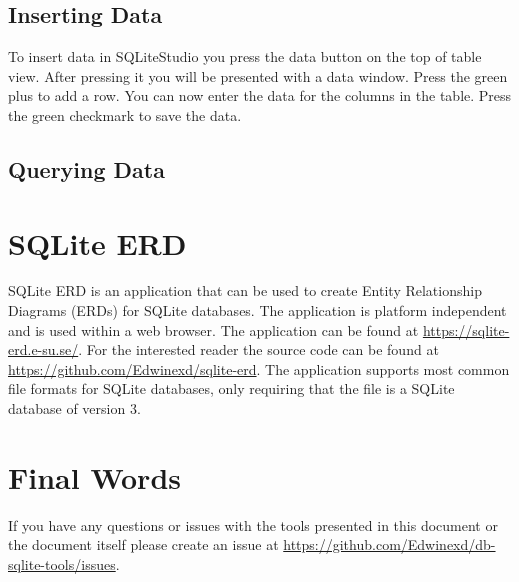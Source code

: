 \documentclass[a4paper,11pt,oneside]{article}
\begin{document}
\begin{sloppypar}
\subsection{Inserting Data}
\label{sqliteStudioInsertingData}
To insert data in SQLiteStudio you press the data button on the top of table view. After pressing it you will be presented with a data window. Press the green plus to add a row. You can now enter the data for the columns in the table. Press the green checkmark to save the data. 
\subsection{Querying Data}
\label{sqliteStudioQueryingData}

\section{SQLite ERD}
\label{sqliteERD}
SQLite ERD is an application that can be used to create Entity Relationship Diagrams (ERDs) for SQLite databases. The application is platform independent and is used within a web browser. The application can be found at \url{https://sqlite-erd.e-su.se/}. For the interested reader the source code can be found at \url{https://github.com/Edwinexd/sqlite-erd}.
The application supports most common file formats for SQLite databases, only requiring that the file is a SQLite database of version 3.


\section{Final Words}
\label{finalWords}
If you have any questions or issues with the tools presented in this document or the document itself please create an issue at \url{https://github.com/Edwinexd/db-sqlite-tools/issues}.


\pagebreak



\end{sloppypar}
\end{document}
